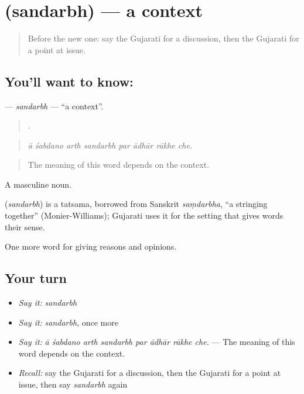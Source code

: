 \section[\texorpdfstring{\gu{સંદર્ભ} (sandarbh)}{સંદર્ભ (sandarbh)}]{ (sandarbh) — a context}

\label{lesson:GU-C341-sandarbh}



\begin{quote}
Before the new one: say the Gujarati for a discussion, then the Gujarati for a point at issue.
\end{quote}

\subsection*{You'll want to know: }
\textbf{} — \emph{sandarbh} — \textquotedblleft{}a context\textquotedblright{}.

\begin{quote}
       .
\end{quote}

\begin{quote}
\emph{ā śabdano arth sandarbh par ādhār rākhe che.}
\end{quote}

\begin{quote}
The meaning of this word depends on the context.
\end{quote}

A masculine noun.

\begin{cousinweb}
\textbf{} (\emph{sandarbh}) is a tatsama, borrowed from Sanskrit \emph{saṃdarbha}, \textquotedblleft{}a stringing together\textquotedblright{} (Monier-Williams); Gujarati uses it for the setting that gives words their sense.
\end{cousinweb}

\begin{grammarlens}[title={What you've built}]
One more word for giving reasons and opinions.
\end{grammarlens}

\subsection*{Your turn}
\begin{itemize}
\raggedright
  \item \emph{Say it:} \emph{sandarbh}
  \item \emph{Say it:} \emph{sandarbh}, once more
  \item \emph{Say it:} \emph{ā śabdano arth sandarbh par ādhār rākhe che.} — The meaning of this word depends on the context.
  \item \emph{Recall:} say the Gujarati for a discussion, then the Gujarati for a point at issue, then say \emph{sandarbh} again
\end{itemize}

